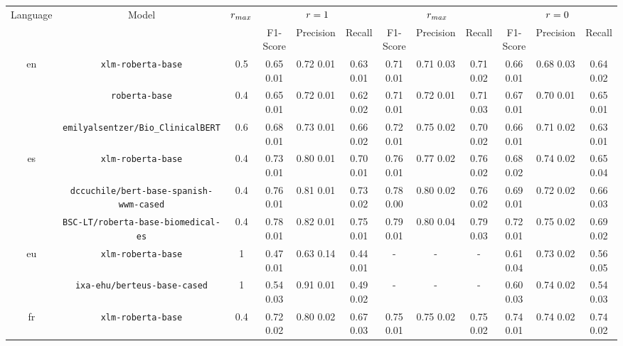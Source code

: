 \begin{tabular}{@{}cccccccccccc@{}}%
\toprule%
Language&Model&$r_{max}$&\multicolumn{3}{c}{$r=1$}&\multicolumn{3}{c}{$r_{max}$}&\multicolumn{3}{c}{$r=0$}\\%
&&&F1-Score&Precision&Recall&F1-Score&Precision&Recall&F1-Score&Precision&Recall\\%
\midrule%
en&\verb|xlm-roberta-base|&0.5&0.65 \bm{$\pm$} 0.01&0.72 \bm{$\pm$} 0.01&0.63 \bm{$\pm$} 0.01&0.71 \bm{$\pm$} 0.01&0.71 \bm{$\pm$} 0.03&0.71 \bm{$\pm$} 0.02&0.66 \bm{$\pm$} 0.01&0.68 \bm{$\pm$} 0.03&0.64 \bm{$\pm$} 0.02\\%
&\verb|roberta-base|&0.4&0.65 \bm{$\pm$} 0.01&0.72 \bm{$\pm$} 0.01&0.62 \bm{$\pm$} 0.02&0.71 \bm{$\pm$} 0.01&0.72 \bm{$\pm$} 0.01&0.71 \bm{$\pm$} 0.03&0.67 \bm{$\pm$} 0.01&0.70 \bm{$\pm$} 0.01&0.65 \bm{$\pm$} 0.01\\%
&\verb|emilyalsentzer/Bio_ClinicalBERT|&0.6&0.68 \bm{$\pm$} 0.01&0.73 \bm{$\pm$} 0.01&0.66 \bm{$\pm$} 0.02&0.72 \bm{$\pm$} 0.01&0.75 \bm{$\pm$} 0.02&0.70 \bm{$\pm$} 0.02&0.66 \bm{$\pm$} 0.01&0.71 \bm{$\pm$} 0.02&0.63 \bm{$\pm$} 0.01\\%
\midrule%
es&\verb|xlm-roberta-base|&0.4&0.73 \bm{$\pm$} 0.01&0.80 \bm{$\pm$} 0.01&0.70 \bm{$\pm$} 0.01&0.76 \bm{$\pm$} 0.01&0.77 \bm{$\pm$} 0.02&0.76 \bm{$\pm$} 0.02&0.68 \bm{$\pm$} 0.02&0.74 \bm{$\pm$} 0.02&0.65 \bm{$\pm$} 0.04\\%
&\verb|dccuchile/bert-base-spanish-wwm-cased|&0.4&0.76 \bm{$\pm$} 0.01&0.81 \bm{$\pm$} 0.01&0.73 \bm{$\pm$} 0.02&0.78 \bm{$\pm$} 0.00&0.80 \bm{$\pm$} 0.02&0.76 \bm{$\pm$} 0.02&0.69 \bm{$\pm$} 0.01&0.72 \bm{$\pm$} 0.02&0.66 \bm{$\pm$} 0.03\\%
&\verb|BSC-LT/roberta-base-biomedical-es|&0.4&0.78 \bm{$\pm$} 0.01&0.82 \bm{$\pm$} 0.01&0.75 \bm{$\pm$} 0.01&0.79 \bm{$\pm$} 0.01&0.80 \bm{$\pm$} 0.04&0.79 \bm{$\pm$} 0.03&0.72 \bm{$\pm$} 0.01&0.75 \bm{$\pm$} 0.02&0.69 \bm{$\pm$} 0.02\\%
\midrule%
eu&\verb|xlm-roberta-base|&1&0.47 \bm{$\pm$} 0.01&0.63 \bm{$\pm$} 0.14&0.44 \bm{$\pm$} 0.01&{-}&{-}&{-}&0.61 \bm{$\pm$} 0.04&0.73 \bm{$\pm$} 0.02&0.56 \bm{$\pm$} 0.05\\%
&\verb|ixa-ehu/berteus-base-cased|&1&0.54 \bm{$\pm$} 0.03&0.91 \bm{$\pm$} 0.01&0.49 \bm{$\pm$} 0.02&{-}&{-}&{-}&0.60 \bm{$\pm$} 0.03&0.74 \bm{$\pm$} 0.02&0.54 \bm{$\pm$} 0.03\\%
\midrule%
fr&\verb|xlm-roberta-base|&0.4&0.72 \bm{$\pm$} 0.02&0.80 \bm{$\pm$} 0.02&0.67 \bm{$\pm$} 0.03&0.75 \bm{$\pm$} 0.01&0.75 \bm{$\pm$} 0.02&0.75 \bm{$\pm$} 0.02&0.74 \bm{$\pm$} 0.01&0.74 \bm{$\pm$} 0.02&0.74 \bm{$\pm$} 0.02\\%

\end{tabular}
